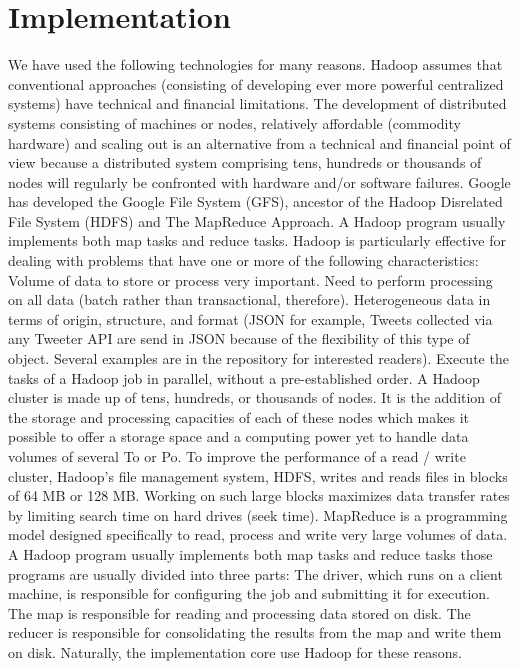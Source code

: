 \documentclass{acmtog} %
\begin{document}
\section{Implementation}
\label{sec:implementation}

We have used the following technologies for many reasons. Hadoop assumes that conventional approaches (consisting of developing ever more powerful centralized systems) have technical and financial limitations. The development of distributed systems consisting of machines or nodes, relatively affordable (commodity hardware) and scaling out is an alternative from a technical and financial point of view because a distributed system comprising tens, hundreds or thousands of nodes will regularly be confronted with hardware and/or software failures. Google has developed the Google File System (GFS), ancestor of the Hadoop Disrelated File System (HDFS) \citep{Baltas17} and The MapReduce Approach. A Hadoop program usually implements both map tasks and reduce tasks. Hadoop is particularly effective for dealing with problems that have one or more of the following characteristics: Volume of data to store or process very important. Need to perform processing on all data (batch rather than transactional, therefore). Heterogeneous data in terms of origin, structure, and format (JSON for example, Tweets collected via any Tweeter API are send in JSON because of the flexibility of this type of object. Several examples are in the repository for interested readers). Execute the tasks of a Hadoop job in parallel, without a pre-established order. A Hadoop cluster is made up of tens, hundreds, or thousands of nodes. It is the addition of the storage and processing capacities of each of these nodes which makes it possible to offer a storage space and a computing power yet to handle data volumes of several To or Po. To improve the performance of a read / write cluster, Hadoop’s file management system, HDFS, writes and reads files in blocks of 64 MB or 128 MB. Working on such large blocks maximizes data transfer rates by limiting search time on hard drives (seek time). MapReduce is a programming model designed specifically to read, process and write very large volumes of data. A Hadoop program usually implements both map tasks and reduce tasks those programs are usually divided into three parts: The driver, which runs on a client machine, is responsible for configuring the job and submitting it for execution. The map is responsible for reading and processing data stored on disk. The reducer is responsible for consolidating the results from the map and write them on disk. Naturally, the implementation core use Hadoop for these reasons.
\end{document}
